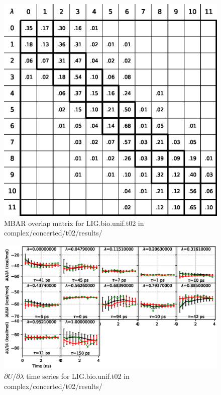 \documentclass[journal=jctcce,manuscript=article,hyperref=false]{achemso}
\begin{document}
\begin{figure}
\includegraphics[clip,width=6in]{complex.concerted.t02.results..S.eps}\vspace{-0.3cm}
\caption{MBAR overlap matrix for LIG.bio.unif.t02 in complex/concerted/t02/results/}
\end{figure}


\begin{figure}
\includegraphics[clip,width=6in]{complex.concerted.t02.results..DVDLvsT.eps}\vspace{-0.3cm}
\caption{$\partial U/\partial\lambda$ time series for LIG.bio.unif.t02 in complex/concerted/t02/results/}
\end{figure}
\end{document}
